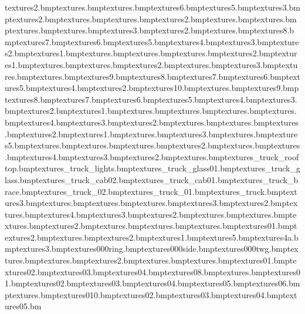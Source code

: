 textures\toiletrolls2.bmp textures\toiletrolls.bmp textures\toiletdoor.bmp textures\toilet6.bmp textures\toilet5.bmp textures\toilet3.bmp textures\toilet2.bmp textures\toilet.bmp textures\tempscroll.bmp textures\tazwin2.bmp textures\tazwantedposback.bmp textures\tazwantedpaintings.bmp textures\tazwantedback.bmp textures\tazwanted.bmp textures\tazfacecoin3.bmp textures\tazfacecoin2.bmp textures\tazfacecoin.bmp textures\target8.bmp textures\target7.bmp textures\target6.bmp textures\target5.bmp textures\target4.bmp textures\target3.bmp textures\target2.bmp textures\target1.bmp textures\tabletop.bmp textures\tableleg.bmp textures\swordandshield.bmp textures\strings2.bmp textures\strings1.bmp textures\steelsteps.bmp textures\stairs.bmp textures\stairail2.bmp textures\stairail.bmp textures\skip3.bmp textures\sink.bmp textures\signtoilet.bmp textures\signinfo9.bmp textures\signinfo8.bmp textures\signinfo7.bmp textures\signinfo6.bmp textures\signinfo5.bmp textures\signinfo4.bmp textures\signinfo2.bmp textures\signinfo10.bmp textures\signinfo.bmp textures\signdirection9.bmp textures\signdirection8.bmp textures\signdirection7.bmp textures\signdirection6.bmp textures\signdirection5.bmp textures\signdirection4.bmp textures\signdirection3.bmp textures\signdirection2.bmp textures\signdirection1.bmp textures\sign.bmp textures\shoesred.bmp textures\shoesblue.bmp textures\shipsteps.bmp textures\seccam4.bmp textures\seccam3.bmp textures\seccam2.bmp textures\seccam.bmp textures\sdoorglass.bmp textures\sdoor.bmp textures\sandbox2.bmp textures\sandbox1.bmp textures\safsamface.bmp textures\safeside3.bmp textures\safeback.bmp textures\safe5.bmp textures\rope.bmp textures\roofpanelscorn.bmp textures\roofpanels.bmp textures\rocketbike2.bmp textures\rocketbike.bmp textures\roadnarrows.bmp textures\road4.bmp textures\road3.bmp textures\road2.bmp textures\road.bmp textures\removal_truck_rooftop.bmp textures\removal_truck_lights.bmp textures\removal_truck_glass01.bmp textures\removal_truck_glass.bmp textures\removal_truck_cab02.bmp textures\removal_truck_cab01.bmp textures\removal_truck_brace.bmp textures\removal_truck_02.bmp textures\removal_truck_01.bmp textures\removal_truck.bmp textures\radio3.bmp textures\post.bmp textures\poolside.bmp textures\plugwall.bmp textures\plug3.bmp textures\plug2.bmp textures\plug.bmp textures\plasticbox4.bmp textures\plasticbox3.bmp textures\plasticbox2.bmp textures\plasticbox.bmp textures\plaquenut.bmp textures\plaqueinfo.bmp textures\plaquehotdog2.bmp textures\plaquehotdog.bmp textures\plainsigndiamond.bmp textures\pipe.bmp textures\pinball01.bmp textures\pillardoor2.bmp textures\pillardoor.bmp textures\pillar2.bmp textures\pillar1.bmp textures\piano5.bmp textures\piano4a.bmp textures\piano3.bmp textures\1000ring.bmp textures\1000side.bmp textures\1000twg.bmp textures\ancientcarpet.bmp textures\ancientfloor.bmp textures\ancientfloor2.bmp textures\ancientmarbwall.bmp textures\ancientwalls.bmp textures\anvil01.bmp textures\anvil02.bmp textures\anvil03.bmp textures\anvil04.bmp textures\anvil08.bmp textures\arrowbend.bmp textures\balls01.bmp textures\balls02.bmp textures\balls03.bmp textures\balls04.bmp textures\balls05.bmp textures\balls06.bmp textures\bandaid.bmp textures\bandit010.bmp textures\bandit02.bmp textures\bandit03.bmp textures\bandit04.bmp textures\bandit05.bm